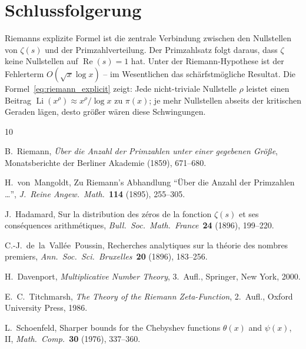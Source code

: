 \documentclass[12pt,a4paper]{amsart}
\theoremstyle{definition}
\DeclareMathOperator{\Re}{Re}
\DeclareMathOperator{\Li}{Li}
\begin{document}
\section{Schlussfolgerung}

Riemanns explizite Formel ist die zentrale Verbindung zwischen den
Nullstellen von $\zeta(s)$ und der Primzahlverteilung.
Der Primzahlsatz folgt daraus, dass $\zeta$ keine Nullstellen auf
$\Re(s)=1$ hat.
Unter der Riemann-Hypothese ist der Fehlerterm $O(\sqrt{x}\log x)$ --
im Wesentlichen das sch\"arfstm\"ogliche Resultat.
Die Formel~\eqref{eq:riemann_explicit} zeigt: Jede nicht-triviale Nullstelle
$\rho$ leistet einen Beitrag $\Li(x^\rho) \approx x^\rho/\log x$ zu $\pi(x)$;
je mehr Nullstellen abseits der kritischen Geraden l\"agen, desto gr\"o\ss er
w\"aren diese Schwingungen.

\begin{thebibliography}{10}

B.~Riemann,
\emph{\"Uber die Anzahl der Primzahlen unter einer gegebenen Gr\"o\ss e},
Monatsberichte der Berliner Akademie (1859), 671--680.

H.~von~Mangoldt,
Zu Riemann's Abhandlung ``\"Uber die Anzahl der Primzahlen \ldots'',
\emph{J.\ Reine Angew.\ Math.}\ \textbf{114} (1895), 255--305.

J.~Hadamard,
Sur la distribution des z\'eros de la fonction $\zeta(s)$ et ses
cons\'equences arithm\'etiques,
\emph{Bull.\ Soc.\ Math.\ France}\ \textbf{24} (1896), 199--220.

C.-J.\ de~la~Vall\'ee~Poussin,
Recherches analytiques sur la th\'eorie des nombres premiers,
\emph{Ann.\ Soc.\ Sci.\ Bruxelles}\ \textbf{20} (1896), 183--256.

H.~Davenport,
\emph{Multiplicative Number Theory}, 3.~Aufl.,
Springer, New York, 2000.

E.~C.~Titchmarsh,
\emph{The Theory of the Riemann Zeta-Function}, 2.~Aufl.,
Oxford University Press, 1986.

L.~Schoenfeld,
Sharper bounds for the Chebyshev functions $\theta(x)$ and $\psi(x)$, II,
\emph{Math.\ Comp.}\ \textbf{30} (1976), 337--360.

\end{thebibliography}
\end{document}
